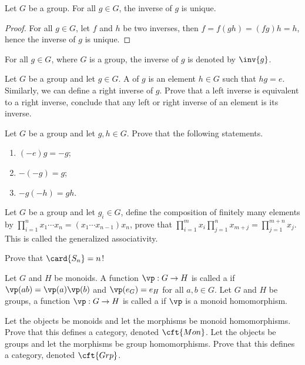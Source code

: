 \documentclass[10pt]{article}
\begin{document}
\begin{proposition}
    Let $G$ be a group. For all $g\in G$, the inverse of $g$ is unique.
\end{proposition}
\begin{proof}
    For all $g\in G$, let $f$ and $h$ be two inverses, then $f=f(gh)=(fg)h=h$, hence the inverse of $g$ is unique.
\end{proof}
\par
For all $g\in G$, where $G$ is a group, the inverse of $g$ is denoted by $\inv{g}$.
\begin{problem}
    Let $G$ be a group and let $g\in G$. A  of $g$ is an element $h\in G$ such that $hg=e$. Similarly, we can define a right inverse of $g$. Prove that a left inverse is equivalent to a right inverse, conclude that any left or right inverse of an element is its inverse.
\end{problem}
\begin{problem}
    Let $G$ be a group and let $g,h\in G$. Prove that the following statements.
    \begin{enumerate}
        \item $(-e)g=-g$;
        \item $-(-g)=g$;
        \item $-g(-h)=gh$.
    \end{enumerate}
\end{problem}
\begin{problem}
    Let $G$ be a group and let ${g}_{i}\in G$, define the composition of finitely many elements by ${\prod}_{i=1}^{n}{x}_{1}\cdots{x}_{n}=({x}_{1}\cdots{x}_{n-1}){x}_{n}$, prove that ${\prod}_{i=1}^{m}{x}_{i}{\prod}_{j=1}^{n}{x}_{m+j}={\prod}_{j=1}^{m+n}{x}_{j}$. This is called the generalized associativity.
\end{problem}
\begin{problem}
    Prove that $\card{{S}_{n}}=n$!
\end{problem}
\begin{definition}
    Let $G$ and $H$ be monoids. A function $\vp:G\to H$ is called a  if $\vp(ab)=\vp(a)\vp(b)$ and $\vp({e}_{G})={e}_{H}$ for all $a,b\in G$. Let $G$ and $H$ be groups, a function $\vp:G\to H$ is called a  if $\vp$ is a monoid homomorphism.
\end{definition}
\begin{problem}
    Let the objects be monoids and let the morphisms be monoid homomorphisms. Prove that this defines a category, denoted $\cft{Mon}$. Let the objects be groups and let the morphisms be group homomorphisms. Prove that this defines a category, denoted $\cft{Grp}$.
\end{problem}
\end{document}
